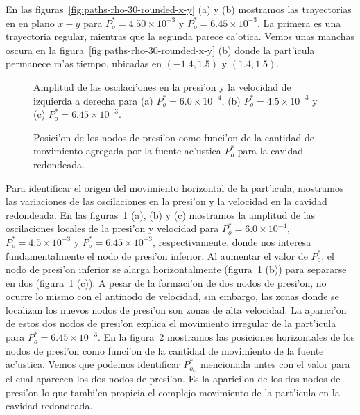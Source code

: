 En las figuras~\ref{fig:paths-rho-30-rounded-x-y} (a) y (b) mostramos las trayectorias en 
en plano $x-y$ para $P^\ast_o=4.50\times 10^{-3}$ y  $P^\ast_o=6.45\times 10^{-3}$.
La primera es una trayectoria regular, mientras que la segunda parece ca'otica. 
Vemos unas manchas oscura en la  figura~\ref{fig:paths-rho-30-rounded-x-y} (b) 
donde la part'icula permanece m'as tiempo, ubicadas en $(-1.4,1.5)$ y  $(1.4,1.5)$.

\begin{figure} 
 
\hskip -3.1cm
 

 
\hskip -3.1cm



 
\hskip -3.1cm
 

\caption{\label{fig:potentials-rounded-rho-30}
Amplitud de las oscilaci'ones en la presi'on y la velocidad de izquierda a derecha para
(a) $P_o^\ast = 6.0\times 10^{-4} $,
(b) $P_o^\ast = 4.5\times 10^{-3}$
y
(c) $P_o^\ast = 6.45\times 10^{-3}$.
}
\end{figure}
\begin{figure} 
 
\caption{\label{fig:bifurcacion-rounded}
Posici'on de los nodos de presi'on como funci'on de la cantidad de movimiento agregada por 
la fuente ac'ustica $P_o^\ast$ para la cavidad redondeada.
}
\end{figure}


Para identificar el origen del movimiento horizontal de la part'icula, mostramos las variaciones de las oscilaciones
en la presi'on y la velocidad en la cavidad redondeada.
En las figuras~\ref{fig:potentials-rounded-rho-30} (a), (b) y (c) mostramos la amplitud de las oscilaciones  locales
de la presi'on y velocidad para $P_o^\ast = 6.0\times 10^{-4} $, $P_o^\ast = 4.5\times 10^{-3}$
y $P_o^\ast = 6.45\times 10^{-3}$, respectivamente, donde nos interesa fundamentalmente 
el nodo de presi'on inferior. Al aumentar el valor de $P_o^\ast$, el nodo de presi'on inferior
se alarga horizontalmente (figura~\ref{fig:potentials-rounded-rho-30} (b)) para separarse en
dos (figura~\ref{fig:potentials-rounded-rho-30} (c)).	
 A pesar de la formaci'on de dos nodos de presi'on, no ocurre lo mismo con el antinodo de velocidad, 
sin embargo, las zonas donde se localizan los nuevos nodos de presi'on son zonas de alta velocidad. La aparici'on de estos
dos nodos de presi'on explica el movimiento irregular de la part'icula para $P^\ast_o = 6.45 \times 10^{-3}$.
En la figura~\ref{fig:bifurcacion-rounded} mostramos las posiciones horizontales de los
nodos de presi'on como funci'on de la cantidad de movimiento de la fuente ac'ustica. Vemos que podemos
identificar $P_{o_C}^\ast$ mencionada antes con el valor para el cual aparecen los dos nodos de presi'on.
Es la aparici'on de los dos nodos de presi'on lo que tambi'en propicia el complejo movimiento de la
part'icula en la cavidad redondeada.


